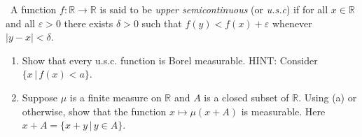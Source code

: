 \documentclass[12pt]{Homework}
\begin{document}
\begin{problem} $\,$
A function $f:\mathbb{R}\to\mathbb{R}$ is said to be \textit{upper semicontinuous} (or \textit{u.s.c}) if for all $x\in\mathbb{R}$ and all $\varepsilon>0$ there exists $\delta>0$ such that $f(y)<f(x)+\varepsilon$ whenever $|y-x|<\delta$.
\begin{enumerate}[label=(\alph*)]
    \item Show that every u.s.c. function is Borel measurable. HINT: Consider $\{x\,|\,f(x)<a\}$.
    \item Suppose $\mu$ is a finite measure on $\mathbb{R}$ and $A$ is a closed subset of $\mathbb{R}$. Using (a) or otherwise, show that the function $x\mapsto\mu(x+A)$ is measurable. Here $x+A=\{x+y\,|\,y\in A\}$.
 \end{enumerate}
\end{problem}
\end{document}
